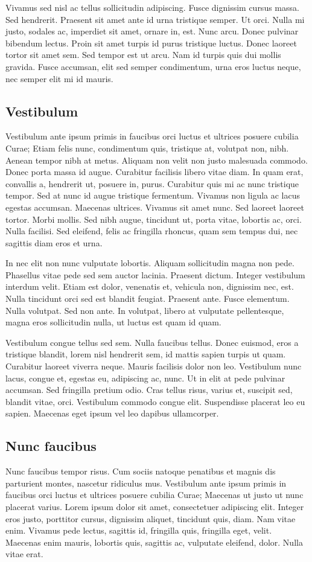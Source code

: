 \documentclass[12pt]{article}
\begin{document}
Vivamus sed nisl ac tellus sollicitudin adipiscing. Fusce dignissim cursus massa. Sed hendrerit. Praesent sit amet ante id urna tristique semper. Ut orci. Nulla mi justo, sodales ac, imperdiet sit amet, ornare in, est. Nunc arcu. Donec pulvinar bibendum lectus. Proin sit amet turpis id purus tristique luctus. Donec laoreet tortor sit amet sem. Sed tempor est ut arcu. Nam id turpis quis dui mollis gravida. Fusce accumsan, elit sed semper condimentum, urna eros luctus neque, nec semper elit mi id mauris. 

\subsection{Vestibulum}
Vestibulum ante ipsum primis in faucibus orci luctus et ultrices posuere cubilia Curae; Etiam felis nunc, condimentum quis, tristique at, volutpat non, nibh. Aenean tempor nibh at metus. Aliquam non velit non justo malesuada commodo. Donec porta massa id augue. Curabitur facilisis libero vitae diam. In quam erat, convallis a, hendrerit ut, posuere in, purus. Curabitur quis mi ac nunc tristique tempor. Sed at nunc id augue tristique fermentum. Vivamus non ligula ac lacus egestas accumsan. Maecenas ultrices. Vivamus sit amet nunc. Sed laoreet laoreet tortor. Morbi mollis. Sed nibh augue, tincidunt ut, porta vitae, lobortis ac, orci. Nulla facilisi. Sed eleifend, felis ac fringilla rhoncus, quam sem tempus dui, nec sagittis diam eros et urna.

In nec elit non nunc vulputate lobortis. Aliquam sollicitudin magna non pede. Phasellus vitae pede sed sem auctor lacinia. Praesent dictum. Integer vestibulum interdum velit. Etiam est dolor, venenatis et, vehicula non, dignissim nec, est. Nulla tincidunt orci sed est blandit feugiat. Praesent ante. Fusce elementum. Nulla volutpat. Sed non ante. In volutpat, libero at vulputate pellentesque, magna eros sollicitudin nulla, ut luctus est quam id quam.

Vestibulum congue tellus sed sem. Nulla faucibus tellus. Donec euismod, eros a tristique blandit, lorem nisl hendrerit sem, id mattis sapien turpis ut quam. Curabitur laoreet viverra neque. Mauris facilisis dolor non leo. Vestibulum nunc lacus, congue et, egestas eu, adipiscing ac, nunc. Ut in elit at pede pulvinar accumsan. Sed fringilla pretium odio. Cras tellus risus, varius et, suscipit sed, blandit vitae, orci. Vestibulum commodo congue elit. Suspendisse placerat leo eu sapien. Maecenas eget ipsum vel leo dapibus ullamcorper. 

\subsection{Nunc faucibus}
Nunc faucibus tempor risus. Cum sociis natoque penatibus et magnis dis parturient montes, nascetur ridiculus mus. Vestibulum ante ipsum primis in faucibus orci luctus et ultrices posuere cubilia Curae; Maecenas ut justo ut nunc placerat varius. Lorem ipsum dolor sit amet, consectetuer adipiscing elit. Integer eros justo, porttitor cursus, dignissim aliquet, tincidunt quis, diam. Nam vitae enim. Vivamus pede lectus, sagittis id, fringilla quis, fringilla eget, velit. Maecenas enim mauris, lobortis quis, sagittis ac, vulputate eleifend, dolor. Nulla vitae erat.
\end{document}
